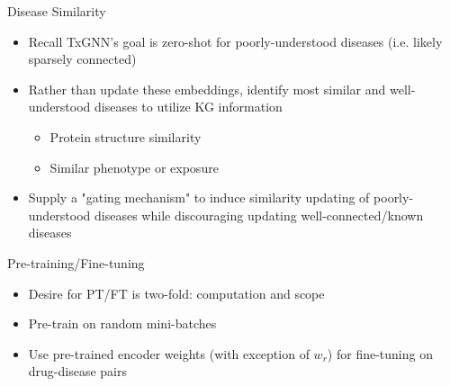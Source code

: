 \documentclass{beamer}
\newcommand{\Loss}{\mathcal{L}}
\begin{document}
\begin{frame}{Disease Similarity}
    \begin{itemize}\setlength\itemsep{4mm}
        \item Recall TxGNN's goal is zero-shot for poorly-understood diseases (i.e. likely sparsely connected) 
        \item Rather than update these embeddings, identify most similar and well-understood diseases to utilize KG information 
        \begin{itemize}
            \item Protein structure similarity 
            \item Similar phenotype or exposure 
        \end{itemize}
        \item Supply a "gating mechanism" to induce similarity updating of poorly-understood diseases while discouraging updating well-connected/known diseases 
    \end{itemize}
\end{frame}

\begin{frame}{Pre-training/Fine-tuning}
    \begin{itemize}\setlength\itemsep{4mm}
        \item Desire for PT/FT is two-fold: computation and scope 
        \item Pre-train on random mini-batches 
        \item Use pre-trained encoder weights (with exception of $w_r$) for fine-tuning on drug-disease pairs 
    \end{itemize}
\end{frame}
\end{document}
